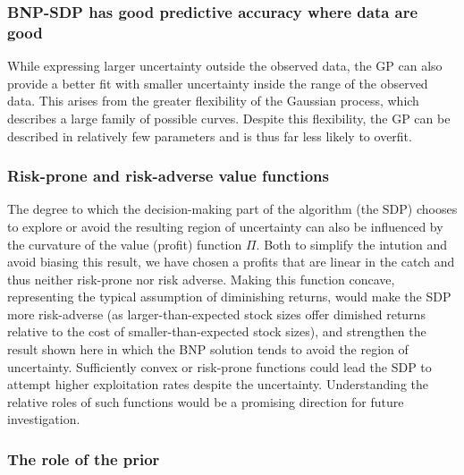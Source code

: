 \documentclass[author-year, review]{elsarticle} %
\begin{document}
\subsubsection{BNP-SDP has good predictive accuracy where data are
good}\label{bnp-sdp-has-good-predictive-accuracy-where-data-are-good}

While expressing larger uncertainty outside the observed data, the GP
can also provide a better fit with smaller uncertainty inside the range
of the observed data. This arises from the greater flexibility of the
Gaussian process, which describes a large family of possible curves.
Despite this flexibility, the GP can be described in relatively few
parameters and is thus far less likely to overfit.

\subsubsection{Risk-prone and risk-adverse value
functions}\label{risk-prone-and-risk-adverse-value-functions}

The degree to which the decision-making part of the algorithm (the SDP)
chooses to explore or avoid the resulting region of uncertainty can also
be influenced by the curvature of the value (profit) function $\Pi$.
Both to simplify the intution and avoid biasing this result, we have
chosen a profits that are linear in the catch and thus neither
risk-prone nor risk adverse. Making this function concave, representing
the typical assumption of diminishing returns, would make the SDP more
risk-adverse (as larger-than-expected stock sizes offer dimished returns
relative to the cost of smaller-than-expected stock sizes), and
strengthen the result shown here in which the BNP solution tends to
avoid the region of uncertainty. Sufficiently convex or risk-prone
functions could lead the SDP to attempt higher exploitation rates
despite the uncertainty. Understanding the relative roles of such
functions would be a promising direction for future investigation.

\subsubsection{The role of the prior}\label{the-role-of-the-prior}
\end{document}

